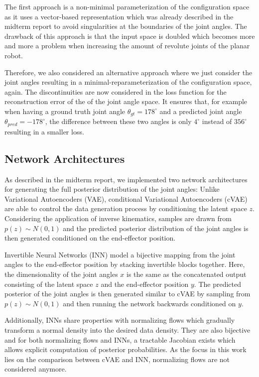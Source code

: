 \documentclass[conference]{IEEEtran}
\begin{document}
The first approach is a non-minimal parameterization of the configuration space as it uses a vector-based representation which was already described in the midterm report to avoid singularities at the boundaries of the joint angles. The drawback of this approach is that the input space is doubled which becomes more and more a problem when increasing the amount of revolute joints of the planar robot.

Therefore, we also considered an alternative approach where we just consider the joint angles resulting in a minimal-reparameterization of the configuration space, again. The discontinuities are now considered in the loss function for the reconstruction error of the of the joint angle space. It ensures that, for example when having a ground truth joint angle $\theta _{gt} = 178^\circ$ and a predicted joint angle $\theta _{pred} = -178^\circ$, the difference between these two angles is only $4^\circ$ instead of $356^\circ$ resulting in a smaller loss.

\subsection*{Network Architectures}

As described in the midterm report, we implemented two network architectures for generating the full posterior distribution of the joint angles: Unlike Variational Autoencoders (VAE), conditional Variational Autoencoders (cVAE) are able to control the data generation process by conditioning the latent space $z$. Considering the application of inverse kinematics,  samples are drawn from $p(z) \sim N(0, 1)$ and the predicted posterior distribution of the joint angles is then generated conditioned on the end-effector position.

Invertible Neural Networks (INN) model a bijective mapping from the joint angles to the end-effector position by stacking invertible blocks together. Here, the dimensionality of the joint angles $x$ is the same as the concatenated output consisting of the latent space $z$ and the end-effector position $y$. The predicted posterior of the joint angles is then generated similar to cVAE by sampling from $p(z) \sim N(0, 1)$ and then running the network backwards conditioned on $y$.

Additionally, INNs share properties with normalizing flows \cite{normalizingFlows2010, normalizingFlows2013} which gradually transform a normal density into the desired data density. They are also bijective and for both normalizing flows and INNs, a tractable Jacobian exists which allows explicit computation of posterior probabilities. As the focus in this work lies on the comparison between cVAE and INN, normalizing flows are not considered anymore.
\end{document}
